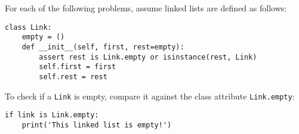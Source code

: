 \begin{blocksection}
For each of the following problems, assume linked lists are defined as follows:
\newline
\begin{lstlisting}
class Link:
    empty = ()
    def __init__(self, first, rest=empty):
        assert rest is Link.empty or isinstance(rest, Link)
        self.first = first
        self.rest = rest
\end{lstlisting}
\vspace{\baselineskip}
To check if a \texttt{Link} is empty, compare it against the class attribute \texttt{Link.empty}:
\newline
\begin{lstlisting}
if link is Link.empty:
    print('This linked list is empty!')
\end{lstlisting}
\end{blocksection}
